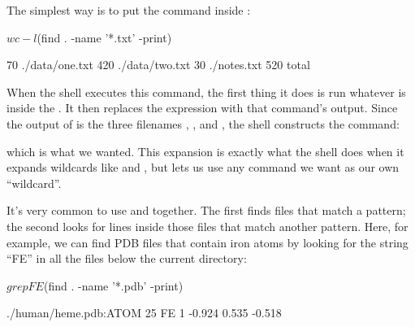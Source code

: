The simplest way is to put the  command inside
\code{\$()}:

\begin{VerbIn}
$ wc -l $(find . -name '*.txt' -print)
\end{VerbIn}

\begin{VerbOut}
70  ./data/one.txt
420  ./data/two.txt
30  ./notes.txt
520  total
\end{VerbOut}

When the shell executes this command, the first thing it does is run
whatever is inside the \code{\$()}. It then replaces the \code{\$()}
expression with that command's output. Since the output of 
is the three filenames , ,
and , the shell constructs the command:


\noindent
which is what we wanted. This expansion is exactly what the shell does
when it expands wildcards like \code{*} and , but lets us
use any command we want as our own ``wildcard''.

It's very common to use  and  together. The
first finds files that match a pattern; the second looks for lines
inside those files that match another pattern. Here, for example, we can
find PDB files that contain iron atoms by looking for the string ``FE''
in all the  files below the current directory:

\begin{VerbIn}
$ grep FE $(find . -name '*.pdb' -print)
\end{VerbIn}

\begin{VerbOut}
./human/heme.pdb:ATOM  25  FE  1  -0.924  0.535  -0.518
\end{VerbOut}

